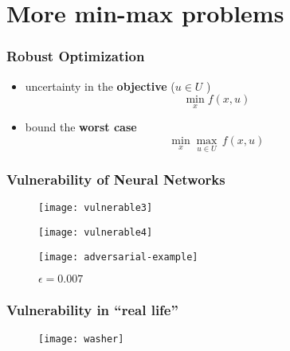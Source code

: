 \documentclass[aspectratio=149]{beamer}
\begin{document}
\section{More min-max problems}%
\label{sec:}

\begin{frame}
  \frametitle{Robust Optimization}
  \begin{itemize}
    \item uncertainty in the \textbf{objective} ($u \in U$ \text{ \textcolor{blue}{uncertainty set}})
          \begin{equation}
            \min_x f(x, u)
          \end{equation}
    \item bound the \textbf{worst case}
          \begin{equation}
            \min_x \max_{u \in U}\, f(x, u)
          \end{equation}
  \end{itemize}
\end{frame}

\begin{frame}
  \frametitle{Vulnerability of Neural Networks}
  \begin{minipage}{0.45\textwidth}
    \begin{figure}[ht]
      \centering
      \texttt{[image: vulnerable3]}
    \end{figure}
  \end{minipage}
  \begin{minipage}{0.5\textwidth}
    \begin{figure}[ht]
      \centering
      \texttt{[image: vulnerable4]}
    \end{figure}
  \end{minipage}

  \begin{figure}[ht]
    \centering
    \texttt{[image: adversarial-example]}
    \caption{$\epsilon=0.007$}
  \end{figure}
\end{frame}


\begin{frame}
  \frametitle{Vulnerability in ``real life''}
  \begin{figure}[ht]
    \centering
    \texttt{[image: washer]}
  \end{figure}
\end{frame}
\end{document}
